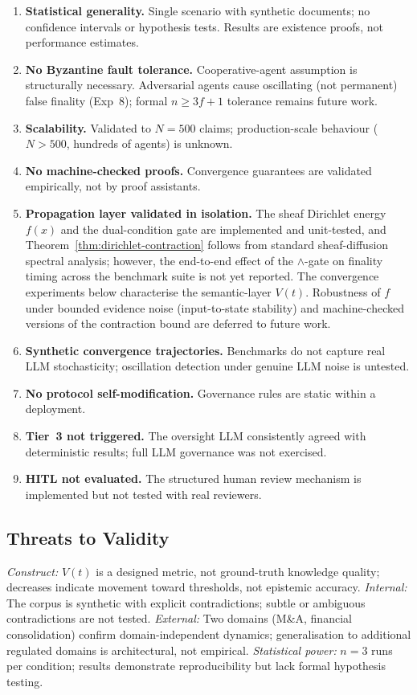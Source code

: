 \documentclass[11pt]{article}
\begin{document}
\begin{enumerate}
  \item \textbf{Statistical generality.} Single scenario with synthetic documents; no confidence intervals or hypothesis tests. Results are existence proofs, not performance estimates.
  \item \textbf{No Byzantine fault tolerance.} Cooperative-agent assumption is structurally necessary. Adversarial agents cause oscillating (not permanent) false finality (Exp~8); formal $n \geq 3f+1$ tolerance remains future work.
  \item \textbf{Scalability.} Validated to $N = 500$ claims; production-scale behaviour ($N > 500$, hundreds of agents) is unknown.
  \item \textbf{No machine-checked proofs.} Convergence guarantees are validated empirically, not by proof assistants.
  \item \textbf{Propagation layer validated in isolation.} The sheaf Dirichlet energy $f(x)$ and the dual-condition gate are implemented and unit-tested, and Theorem~\ref{thm:dirichlet-contraction} follows from standard sheaf-diffusion spectral analysis; however, the end-to-end effect of the $\wedge$-gate on finality timing across the benchmark suite is not yet reported. The convergence experiments below characterise the semantic-layer $V(t)$. Robustness of $f$ under bounded evidence noise (input-to-state stability) and machine-checked versions of the contraction bound are deferred to future work.
  \item \textbf{Synthetic convergence trajectories.} Benchmarks do not capture real LLM stochasticity; oscillation detection under genuine LLM noise is untested.
  \item \textbf{No protocol self-modification.} Governance rules are static within a deployment.
  \item \textbf{Tier~3 not triggered.} The oversight LLM consistently agreed with deterministic results; full LLM governance was not exercised.
  \item \textbf{HITL not evaluated.} The structured human review mechanism is implemented but not tested with real reviewers.
\end{enumerate}

\subsection{Threats to Validity}

\emph{Construct:} $V(t)$ is a designed metric, not ground-truth knowledge quality; decreases indicate movement toward thresholds, not epistemic accuracy.
\emph{Internal:} The corpus is synthetic with explicit contradictions; subtle or ambiguous contradictions are not tested.
\emph{External:} Two domains (M\&A, financial consolidation) confirm domain-independent dynamics; generalisation to additional regulated domains is architectural, not empirical.
\emph{Statistical power:} $n = 3$ runs per condition; results demonstrate reproducibility but lack formal hypothesis testing.
\end{document}
